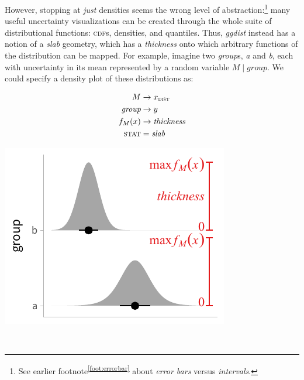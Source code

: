 \documentclass[journal]{vgtc}                     %
\newcommand{\equationfigure}[2]{%
\noindent
\begin{minipage}{.5\columnwidth}
\setlength{\abovedisplayskip}{0pt}
\setlength{\belowdisplayskip}{0pt}
#1\end{minipage}%
\begin{minipage}{.4\columnwidth}\centering #2 \end{minipage}%
\vspace{.5\belowdisplayskip}\\
}
\begin{document}
However, stopping at \textit{just} densities seems the wrong level of abstraction:\footnote{See earlier footnote\textsuperscript{\ref{foot:errorbar}} about \textit{error bars} versus \textit{intervals}.} many useful uncertainty visualizations can be created through the whole suite of distributional functions: \textsc{cdf}s, densities, and quantiles. Thus, \textit{ggdist} instead has a notion of a \textit{slab} geometry, which has a \textit{thickness} onto which arbitrary functions of the distribution can be mapped. For example, imagine two \textit{group}s, \textit{a} and \textit{b}, each with uncertainty in its mean represented by a random variable $M \mid group$. We could specify a density plot of these distributions as:

\equationfigure{
\begin{align*}
M &\rightarrow x_\textsc{dist}\\
\textit{group} &\rightarrow y\\
f_M(x) &\rightarrow \textit{thickness}\\
\textsc{stat} &= \mathit{slab}
\end{align*}
}{\includegraphics[width=1.2\columnwidth]{figs/3-slab_density_two_groups.pdf}}
\end{document}

